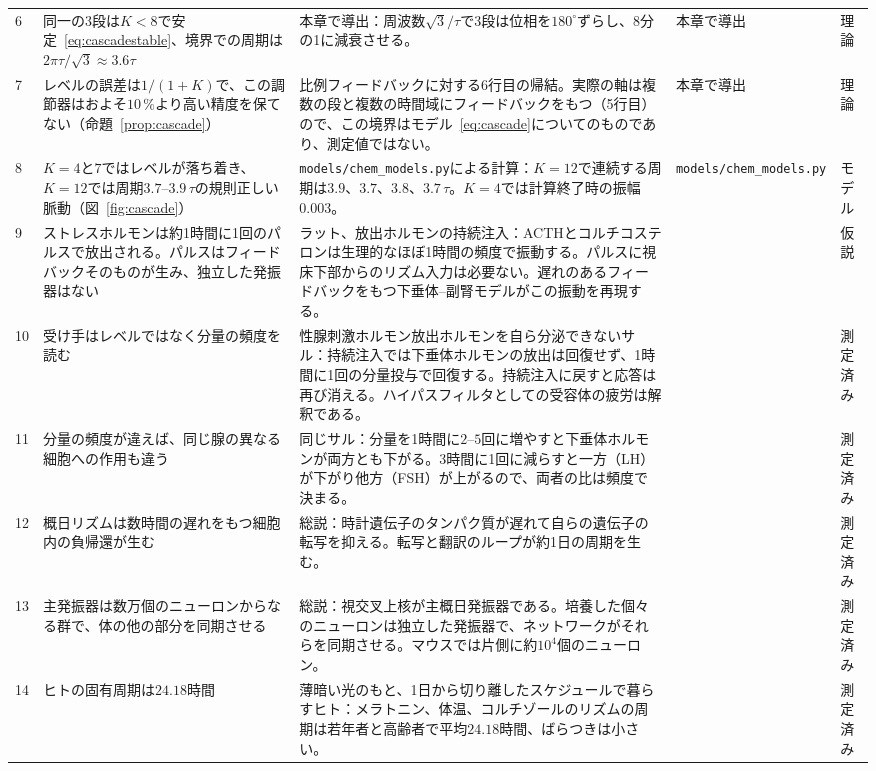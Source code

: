 {\begin{longtable}{>{\raggedright}p{0.5cm}>{\raggedright}p{4.0cm}>{\raggedright}p{5.6cm}>{\raggedright}p{2.3cm}>{\raggedright\arraybackslash}p{1.7cm}}
6 & 同一の3段は$K<8$で安定~\eqref{eq:cascadestable}、境界での周期は$2\pi\tau/\sqrt3\approx3.6\tau$ & 本章で導出：周波数$\sqrt3/\tau$で3段は位相を$180^\circ$ずらし、$8$分の1に減衰させる。 & 本章で導出 & 理論 \\
7 & レベルの誤差は$1/(1+K)$で、この調節器はおよそ$10\,\%$より高い精度を保てない（命題~\ref{prop:cascade}） & 比例フィードバックに対する6行目の帰結。実際の軸は複数の段と複数の時間域にフィードバックをもつ（5行目）ので、この境界はモデル~\eqref{eq:cascade}についてのものであり、測定値ではない。 & 本章で導出 & 理論 \\
8 & $K=4$と$7$ではレベルが落ち着き、$K=12$では周期$3.7$--$3.9\,\tau$の規則正しい脈動（図~\ref{fig:cascade}） & \texttt{models/\allowbreak chem\_\allowbreak models.py}による計算：$K=12$で連続する周期は$3.9$、$3.7$、$3.8$、$3.7\,\tau$。$K=4$では計算終了時の振幅$0.003$。 & \texttt{models/\allowbreak chem\_\allowbreak models.py} & モデル \\
9 & ストレスホルモンは約1時間に1回のパルスで放出される。パルスはフィードバックそのものが生み、独立した発振器はない & ラット、放出ホルモンの持続注入：ACTHとコルチコステロンは生理的なほぼ1時間の頻度で振動する。パルスに視床下部からのリズム入力は必要ない。遅れのあるフィードバックをもつ下垂体--副腎モデルがこの振動を再現する。 & \cite{Walker2012glc, Walker2010} & 仮説 \\
10 & 受け手はレベルではなく分量の頻度を読む & 性腺刺激ホルモン放出ホルモンを自ら分泌できないサル：持続注入では下垂体ホルモンの放出は回復せず、1時間に1回の分量投与で回復する。持続注入に戻すと応答は再び消える。ハイパスフィルタとしての受容体の疲労は解釈である。 & \cite{Belchetz1978} & 測定済み \\
11 & 分量の頻度が違えば、同じ腺の異なる細胞への作用も違う & 同じサル：分量を1時間に$2$--$5$回に増やすと下垂体ホルモンが両方とも下がる。$3$時間に1回に減らすと一方（LH）が下がり他方（FSH）が上がるので、両者の比は頻度で決まる。 & \cite{Wildt1981gnrh} & 測定済み \\
12 & 概日リズムは数時間の遅れをもつ細胞内の負帰還が生む & 総説：時計遺伝子のタンパク質が遅れて自らの遺伝子の転写を抑える。転写と翻訳のループが約1日の周期を生む。 & \cite{TakahashiJS2017} & 測定済み \\
13 & 主発振器は数万個のニューロンからなる群で、体の他の部分を同期させる & 総説：視交叉上核が主概日発振器である。培養した個々のニューロンは独立した発振器で、ネットワークがそれらを同期させる。マウスでは片側に約$10^4$個のニューロン。 & \cite{Welsh2010scn} & 測定済み \\
14 & ヒトの固有周期は$24.18$時間 & 薄暗い光のもと、1日から切り離したスケジュールで暮らすヒト：メラトニン、体温、コルチゾールのリズムの周期は若年者と高齢者で平均$24.18$時間、ばらつきは小さい。 & \cite{Czeisler1999} & 測定済み \\

\end{longtable}}
